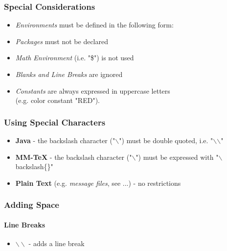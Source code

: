 \subsubsection{Special Considerations}

  \begin{itemize}
    \item \emph{Environments} must be defined in the following form:\\
    \item \emph{Packages} must not be declared
    \item \emph{Math Environment} (i.e. "\$") is not used
    \item \emph{Blanks and Line Breaks} are ignored
    \item \emph{Constants} are always expressed in uppercase letters \\(e.g. color constant "RED").
  \end{itemize}
  
\subsubsection{Using Special Characters}

  \begin{itemize}
    \item \textbf{Java} - the backslash character ("$\backslash$") must be double quoted, i.e. "$\backslash$$\backslash$"
    \item \textbf{MM-TeX} - the backslash character ("$\backslash$") must be expressed with "$\backslash$backslash\{\}"
    \item \textbf{Plain Text} (e.g. \textit{message files}, see ...) - no restrictions
  \end{itemize}

\subsubsection{Adding Space}

\paragraph{Line Breaks}
  \begin{itemize}
    \item $\backslash\backslash$ - adds a line break\\
  \end{itemize}

